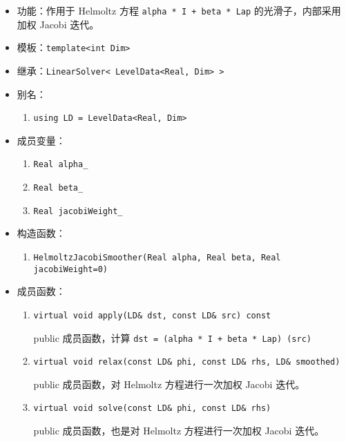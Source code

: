 \documentclass[cn, bibend=bibtex]{elegantpaper}
\theoremstyle{plain}
\begin{document}
\begin{itemize}
  \item 功能：作用于 Helmoltz 方程 \lstinline|alpha * I + beta * Lap| 的光滑子，内部采用加权 Jacobi 迭代。
  \item 模板：\lstinline|template<int Dim>|
  \item 继承：\lstinline|LinearSolver< LevelData<Real, Dim> >|
  \item 别名：
  \begin{enumerate}
      \item \lstinline|using LD = LevelData<Real, Dim>|
  \end{enumerate}
  \item 成员变量：
  \begin{enumerate}
      \item \lstinline|Real alpha_|
      \item \lstinline|Real beta_|
      \item \lstinline|Real jacobiWeight_|
  \end{enumerate}
  \item 构造函数：
  \begin{enumerate}
      \item \lstinline|HelmoltzJacobiSmoother(Real alpha, Real beta, Real jacobiWeight=0)|
  \end{enumerate}
  \item 成员函数：
  \begin{enumerate}
    \item \lstinline|virtual void apply(LD& dst, const LD& src) const|

    public 成员函数，计算 \lstinline|dst = (alpha * I + beta * Lap) (src)|
    \item \lstinline|virtual void relax(const LD& phi, const LD& rhs, LD& smoothed)|

    public 成员函数，对 Helmoltz 方程进行一次加权 Jacobi 迭代。

    \item \lstinline|virtual void solve(const LD& phi, const LD& rhs)|

    public 成员函数，也是对 Helmoltz 方程进行一次加权 Jacobi 迭代。
  \end{enumerate}
\end{itemize}

\end{document}
